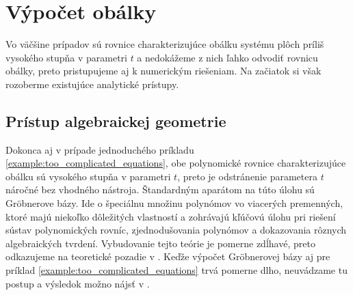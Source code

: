 \section{Výpočet obálky}
Vo väčšine prípadov sú rovnice charakterizujúce obálku systému plôch príliš vysokého stupňa v parametri $t$ a nedokážeme z nich ľahko odvodiť rovnicu obálky, preto pristupujeme aj k numerickým riešeniam. Na začiatok si však rozoberme existujúce analytické prístupy.
\subsection{Prístup algebraickej geometrie}
Dokonca aj v prípade jednoduchého príkladu \ref{example:too_complicated_equations}, obe polynomické rovnice charakterizujúce obálku sú vysokého stupňa v parametri $t$, preto je odstránenie parametera $t$ náročné bez vhodného nástroja. Štandardným aparátom na túto úlohu sú Gröbnerove bázy. Ide o špeciálnu množinu polynómov vo viacerých premenných, ktoré majú niekoľko dôležitých vlastností a zohrávajú kľúčovú úlohu pri riešení sústav polynomických rovníc, zjednodušovania polynómov a dokazovania rôznych algebraických tvrdení. Vybudovanie tejto teórie je pomerne zdĺhavé, preto odkazujeme na teoretické pozadie v \cite{Chalm}.
Keďže výpočet Gröbnerovej bázy aj pre príklad \ref{example:too_complicated_equations} trvá pomerne dlho, neuvádzame tu postup a výsledok možno nájsť v . 
